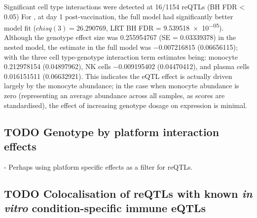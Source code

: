 Significant cell type interactions were detected at 16/1154 \glspl{reQTL} (BH FDR < 0.05)
For , at day 1 post-vaccination, the full model had significantly better model fit ($chisq(3) = 26.290769$, \gls{LRT} BH FDR = \num{9.539518e-05}).
Although the genotype effect size was \num{0.255954767} (SE = \num{0.03339378}) in the nested model,
the estimate in the full model was \num{-0.007216815} (\num{0.06656115});
with the three cell type-genotype interaction term estimates being:
monocyte \num{0.212978154} (\num{0.04897962}),
\gls{NK} cells \num{-0.009195402} (\num{0.04470412}),
and plasma cells \num{0.016151511} (\num{0.06632921}).
This indicates the \gls{eQTL} effect is actually driven largely by the monocyte abundance;
in the case when monocyte abundance is zero (representing an average abundance across all samples, as scores are standardised), the effect of increasing genotype dosage on  expression is minimal.

\subsection{TODO Genotype by platform interaction effects}

%
- Perhaps using platform specific effects as a filter for reQTLs.

\subsection{TODO Colocalisation of reQTLs with known \textit{in vitro} condition-specific immune eQTLs}

